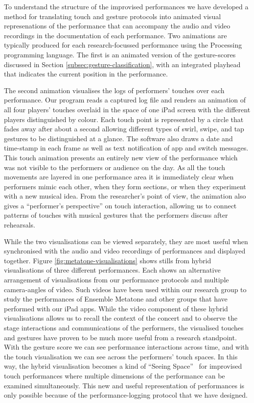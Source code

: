 \documentclass[graybox]{svmult}
\begin{document}
To understand the structure of the improvised performances we have
developed a method for translating touch and gesture protocols into
animated visual represenations of the performance that can accompany
the audio and video recordings in the documentation of each
performance. Two animations are typically produced for each
research-focussed performance using the 
Processing~\cite{Reas:2006kq} programming language.
The first is an animated version of the gesture-scores
discussed in Section \ref{subsec:gesture-classification}, with an
integrated playhead that indicates the current position in the
performance. 

The second animation visualises the logs of performers'
touches over each performance. Our program reads a captured log file
and renders an animation of all four players' touches overlaid in the
space of one iPad screen with the different players distinguished by
colour. Each touch point is represented by a circle that fades away
after about a second allowing different types of swirl, swipe, and tap
gestures to be distinguished at a glance. The software also draws a
date and time-stamp in each frame as well as text notification of app
and switch messages.
This touch animation presents an entirely new view of the
performance which was not visible to the performers or audience on the
day. As all the touch movements are layered in one performance area it
is immediately clear when performers mimic each other, when they form sections,
or when they experiment with a new musical idea. From the researcher's point of
view, the animation also gives a ``performer's perspective'' on touch
interaction, allowing us to connect patterns of touches with musical
gestures that the performers discuss after rehearsals.

While the two visualisations can be viewed separately, they are most
useful when synchronised with the audio and video recordings of
performances and displayed together. Figure
\ref{fig:metatone-visualisations} shows stills from hybrid
visualisations of three different performances. Each shows an
alternative arrangement of visualisations from our performance
protocols and multiple camera-angles of video. Such videos have been
used within our research group to study the performances of Ensemble
Metatone and other groups that have performed with our iPad apps.
While the video component of these hybrid visualisations allows us to
recall the context of the concert and to observe the stage
interactions and communications of the performers, the visualised
touches and gestures have proven to be much more useful from a
research standpoint. With the gesture score we can see performance
interactions across time, and with the touch visualisation we can see
across the performers' touch spaces. In this way, the hybrid
visualisation becomes a kind of ``Seeing Space''~\cite{Victor:2014sf}
for improvised touch performances where multiple dimensions of the
performance can be examined simultaneously. This new and useful
representation of performances is only possible because of the
performance-logging protocol that we have designed.
\end{document}
